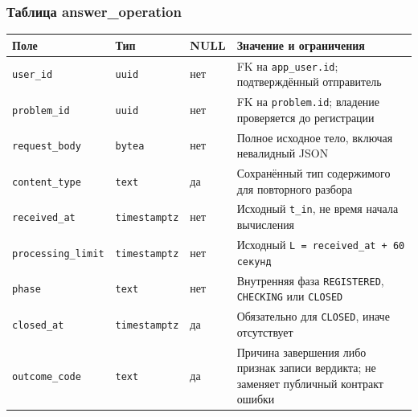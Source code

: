 \documentclass[12pt,a4paper]{article}
\newcounter{none} %
\begin{document}
\hypertarget{зарегистрированные-ответы}{}

\subsubsection{Таблица answer\_operation}\label{ux442ux430ux431ux43bux438ux446ux430-answer_operation}

\hypertarget{таблица-answer_operation}{}

{\def\LTcaptype{none} %
\begin{longtable}[]{@{}
  >{\raggedright\arraybackslash}p{}
  >{\raggedright\arraybackslash}p{}
  >{\raggedright\arraybackslash}p{}
  >{\raggedright\arraybackslash}p{}@{}}
\toprule\noalign{}
\begin{minipage}[b]{\linewidth}\raggedright
Поле
\end{minipage} & \begin{minipage}[b]{\linewidth}\raggedright
Тип
\end{minipage} & \begin{minipage}[b]{\linewidth}\raggedright
NULL
\end{minipage} & \begin{minipage}[b]{\linewidth}\raggedright
Значение и ограничения
\end{minipage} \\
\midrule\noalign{}
\endhead
\bottomrule\noalign{}
\endlastfoot
\texttt{user\_id} & \texttt{uuid} & нет & FK на \texttt{app\_\allowbreak{}user.\allowbreak{}id}; подтверждённый отправитель \\
\texttt{problem\_id} & \texttt{uuid} & нет & FK на \texttt{problem.id}; владение проверяется до регистрации \\
\texttt{request\_\allowbreak{}body} & \texttt{bytea} & нет & Полное исходное тело, включая невалидный JSON \\
\texttt{content\_\allowbreak{}type} & \texttt{text} & да & Сохранённый тип содержимого для повторного разбора \\
\texttt{received\_\allowbreak{}at} & \texttt{timestamptz} & нет & Исходный \texttt{t\_in}, не время начала вычисления \\
\texttt{processing\_\allowbreak{}limit} & \texttt{timestamptz} & нет & Исходный \texttt{L =\allowbreak{} received\_\allowbreak{}at + 60 секунд} \\
\texttt{phase} & \texttt{text} & нет & Внутренняя фаза \texttt{REGISTERED}, \texttt{CHECKING} или \texttt{CLOSED} \\
\texttt{closed\_at} & \texttt{timestamptz} & да & Обязательно для \texttt{CLOSED}, иначе отсутствует \\
\texttt{outcome\_\allowbreak{}code} & \texttt{text} & да & Причина завершения либо признак записи вердикта; не заменяет публичный контракт ошибки \\
\end{longtable}
}
\end{document}
